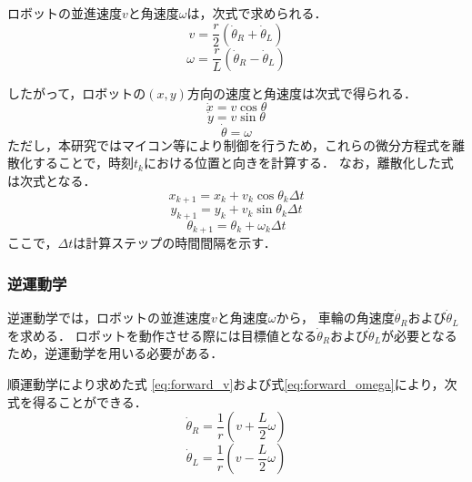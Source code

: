 ロボットの並進速度$v$と角速度$\omega$は，次式で求められる．
\begin{equation}
    v = \frac{r}{2} (\dot{\theta}_R + \dot{\theta}_L)
    \label{eq:forward_v}
\end{equation}
\begin{equation}
    \omega = \frac{r}{L} (\dot{\theta}_R - \dot{\theta}_L)
    \label{eq:forward_omega}
\end{equation}

したがって，ロボットの$(x, y)$方向の速度と角速度は次式で得られる．
\begin{equation}
    \dot{x} = v \cos \theta
    \label{eq:forward_x}
\end{equation}
\begin{equation}
    \dot{y} = v \sin \theta
    \label{eq:forward_y}
\end{equation}
\begin{equation}
    \dot{\theta} = \omega
    \label{eq:forward_theta}
\end{equation}
ただし，本研究ではマイコン等により制御を行うため，これらの微分方程式を離散化することで，時刻$t_k$における位置と向きを計算する．
なお，離散化した式は次式となる．
\begin{equation}
    x_{k+1} = x_k + v_k \cos \theta_k \Delta t
    \label{eq:discrete_x}
\end{equation}
\begin{equation}
    y_{k+1} = y_k + v_k \sin \theta_k \Delta t
    \label{eq:discrete_y}
\end{equation}
\begin{equation}
    \theta_{k+1} = \theta_k + \omega_k \Delta t
    \label{eq:discrete_theta}
\end{equation}
ここで，$\Delta t$は計算ステップの時間間隔を示す．


\subsubsection{逆運動学}
逆運動学では，ロボットの並進速度$v$と角速度$\omega$から，
車輪の角速度$\dot{\theta}_R$および$\dot{\theta}_L$を求める．
ロボットを動作させる際には目標値となる$\dot{\theta}_R$および$\dot{\theta}_L$が必要となるため，逆運動学を用いる必要がある．

順運動学により求めた式 \eqref{eq:forward_v}および式\eqref{eq:forward_omega}により，次式を得ることができる．
\begin{equation}
    \dot{\theta}_R = \frac{1}{r} (v + \frac{L}{2} \omega)
    \label{eq:theta_R}
\end{equation}
\begin{equation}
    \dot{\theta}_L = \frac{1}{r} (v - \frac{L}{2} \omega)
    \label{eq:theta_L}
\end{equation}

